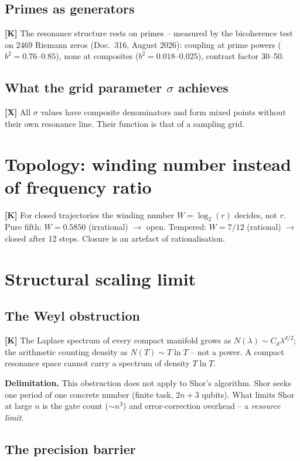 \subsection{Primes as generators}

\textbf{[K]} The resonance structure rests on primes -- measured by the
bicoherence test on 2469 Riemann zeros (Doc.~316, August 2026): coupling
at prime powers ($b^2=0.76$--$0.85$), none at composites
($b^2=0.018$--$0.025$), contrast factor 30--50.

\subsection{What the grid parameter $\sigma$ achieves}

\textbf{[X]} All $\sigma$ values have composite denominators and form
mixed points without their own resonance line. Their function is that of
a sampling grid.

\section{Topology: winding number instead of frequency ratio}

\textbf{[K]} For closed trajectories the winding number $W=\log_2(r)$
decides, not $r$. Pure fifth: $W=0.5850$ (irrational) $\to$ open.
Tempered: $W=7/12$ (rational) $\to$ closed after 12 steps. Closure is
an artefact of rationalisation.

\section{Structural scaling limit}

\subsection{The Weyl obstruction}

\textbf{[K]} The Laplace spectrum of every compact manifold grows as
$N(\lambda)\sim C_d\lambda^{d/2}$; the arithmetic counting density as
$N(T)\sim T\ln T$ -- not a power. A compact resonance space cannot carry
a spectrum of density $T\ln T$.

\textbf{Delimitation.} This obstruction does not apply to Shor's
algorithm. Shor seeks one period of one concrete number (finite task,
$2n+3$ qubits). What limits Shor at large $n$ is the gate count
($\sim n^3$) and error-correction overhead -- a \emph{resource limit}.

\subsection{The precision barrier}

